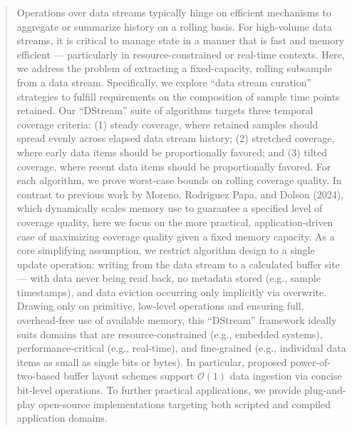 \begin{abstract}
Operations over data streams typically hinge on efficient mechanisms to aggregate or summarize history on a rolling basis.
For high-volume data streams, it is critical to manage state in a manner that is fast and memory efficient --- particularly in resource-constrained or real-time contexts.
Here, we address the problem of extracting a fixed-capacity, rolling subsample from a data stream.
Specifically, we explore ``data stream curation'' strategies to fulfill requirements on the composition of sample time points retained.
Our ``DStream'' suite of algorithms targets three temporal coverage criteria: (1) steady coverage, where retained samples should spread evenly across elapsed data stream history; (2) stretched coverage, where early data items should be proportionally favored; and (3) tilted coverage, where recent data items should be proportionally favored.
For each algorithm, we prove worst-case bounds on rolling coverage quality.
In contrast to previous work by Moreno, Rodriguez Papa, and Dolson (2024), which dynamically scales memory use to guarantee a specified level of coverage quality, here we focus on the more practical, application-driven case of maximizing coverage quality given a fixed memory capacity.
As a core simplifying assumption, we restrict algorithm design to a single update operation: writing from the data stream to a calculated buffer site --- with data never being read back, no metadata stored (e.g., sample timestamps), and data eviction occurring only implicitly via overwrite.
Drawing only on primitive, low-level operations and ensuring full, overhead-free use of available memory, this ``DStream'' framework ideally suits domains that are resource-constrained (e.g., embedded systems), performance-critical (e.g., real-time), and fine-grained (e.g., individual data items as small as single bits or bytes).
In particular, proposed power-of-two-based buffer layout schemes support $\mathcal{O}(1)$ data ingestion via concise bit-level operations.
To further practical applications, we provide plug-and-play open-source implementations targeting both scripted and compiled application domains.
\end{abstract}
